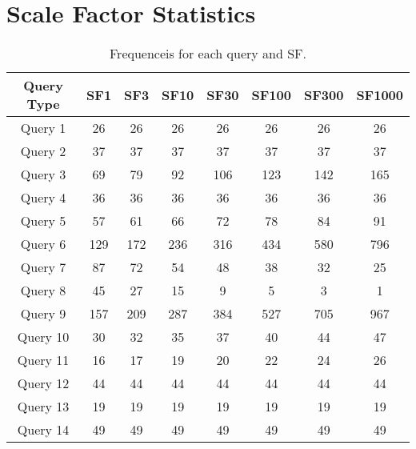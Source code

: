 \section{Scale Factor Statistics}\label{appendix:scale_factors}

\begin{table}[H]
\centering
\begin{tabular}{|c|c|c|c|c|c|c|c|}
   \hline
   \textbf{Query Type} & \textbf{SF1} & \textbf{SF3}& \textbf{SF10} & \textbf{SF30} & \textbf{SF100} & \textbf{SF300} & \textbf{SF1000} \\ 
   \hline
   \hline
   Query 1 & 26  & 26  & 26  & 26  & 26  & 26  & 26 \\ 
   \hline                                           
   Query 2 & 37  & 37  & 37  & 37  & 37  & 37  & 37 \\  
   \hline                                           
   Query 3 & 69  & 79  & 92  & 106 & 123 & 142 & 165\\ 
   \hline                                           
   Query 4 & 36  & 36  & 36  & 36  & 36  & 36  & 36 \\ 
   \hline                                           
   Query 5 & 57  & 61  & 66  & 72  & 78  & 84  & 91 \\ 
   \hline                                           
   Query 6 & 129 & 172 & 236 & 316 & 434 & 580 & 796\\  
   \hline                                           
   Query 7 & 87 & 72   & 54  & 48  & 38  & 32  & 25 \\ 
   \hline
   Query 8 & 45 &  27  & 15  & 9   & 5   & 3   & 1  \\ 
   \hline                                           
   Query 9 & 157 & 209 & 287 & 384 & 527 & 705 & 967\\  
   \hline                                           
   Query 10 & 30 & 32  & 35  & 37  & 40  & 44  & 47 \\ 
   \hline                                           
   Query 11 & 16 & 17  & 19  & 20  & 22  & 24  & 26 \\ 
   \hline                                           
   Query 12 & 44 & 44  & 44  & 44  & 44  & 44  & 44 \\ 
   \hline                                           
   Query 13 & 19 & 19  & 19  & 19  & 19  & 19  & 19 \\  
   \hline                                           
   Query 14 & 49 & 49  & 49  & 49  & 49  & 49  & 49 \\ 
   \hline
   \end{tabular}
   \caption{Frequenceis for each query and SF.}
   \label{table:freqs_sf1}
\end{table}

